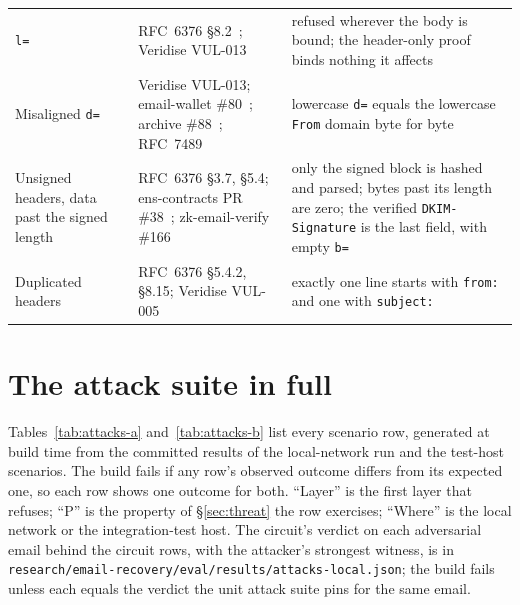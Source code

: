 \begin{table}[h]
\begin{tabularx}{\textwidth}{@{}>{\raggedright\arraybackslash}p{}>{\raggedright\arraybackslash}p{}>{\raggedright\arraybackslash}X@{}}
    \texttt{l=} & RFC~6376 \S8.2~\cite{rfc6376}; Veridise VUL-013 & refused wherever the body is bound; the header-only proof binds nothing it affects \\
    Misaligned \texttt{d=} & Veridise VUL-013; email-wallet \#80~\cite{emailwallet-issue80}; archive \#88~\cite{archive-issue88}; RFC~7489~\cite{rfc7489} & lowercase \texttt{d=} equals the lowercase \texttt{From} domain byte for byte \\
    Unsigned headers, data past the signed length & RFC~6376 \S3.7, \S5.4; ens-contracts PR \#38~\cite{enscontracts-pr38}; zk-email-verify \#166~\cite{zkemailverify-issue166} & only the signed block is hashed and parsed; bytes past its length are zero; the verified \texttt{DKIM-Signature} is the last field, with empty \texttt{b=} \\
    Duplicated headers & RFC~6376 \S5.4.2, \S8.15; Veridise VUL-005 & exactly one line starts with \texttt{from:} and one with \texttt{subject:} \\
    \bottomrule
  \end{tabularx}
\end{table}

\section{The attack suite in full}\label{app:attacks}

Tables~\ref{tab:attacks-a} and~\ref{tab:attacks-b} list every scenario row,
generated at build time from the committed results of the local-network run
and the test-host scenarios. The build fails if any row's observed outcome
differs from its expected one, so each row shows one outcome for both.
``Layer'' is the first layer that refuses; ``P'' is the property of
\S\ref{sec:threat} the row exercises; ``Where'' is the local network or the
integration-test host. The circuit's verdict on each adversarial email
behind the circuit rows, with the attacker's strongest witness, is in
\nolinkurl{research/email-recovery/eval/results/attacks-local.json}; the build
fails unless each equals the verdict the unit attack suite pins for the same
email.

\newcommand\AttackTable[3]{%
  \begin{table}[p]
    \caption{#1}
    \label{#2}
    \scriptsize\renewcommand\arraystretch{0.92}
    \begin{tabularx}{\textwidth}{@{}>{\raggedright\arraybackslash}X>{\raggedright\arraybackslash}p{0.2\textwidth}>{\raggedright\arraybackslash}p{0.14\textwidth}cc@{}}
      \toprule
      Scenario & Expected and observed outcome & Layer & P & Where \\
      \midrule
      #3
      \bottomrule
    \end{tabularx}
  \end{table}}


